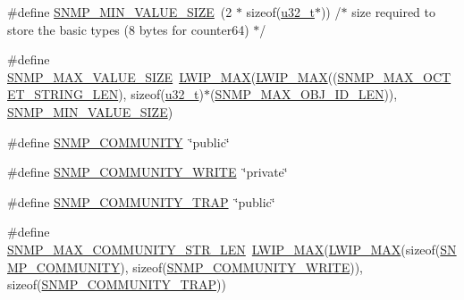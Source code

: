 \begin{DoxyCompactItemize}
\item 
\#define \hyperlink{group__snmp__opts_gac815d0dbe576299546ac612e7eaf3f90}{S\+N\+M\+P\+\_\+\+M\+I\+N\+\_\+\+V\+A\+L\+U\+E\+\_\+\+S\+I\+ZE}~(2 $\ast$ sizeof(\hyperlink{group__compiler__abstraction_ga4c14294869aceba3ef9d4c0c302d0f33}{u32\+\_\+t}$\ast$)) /$\ast$ size required to store the basic types (8 bytes for counter64) $\ast$/
\item 
\#define \hyperlink{group__snmp__opts_gafb4362575bc50476a7401a1ed14787f0}{S\+N\+M\+P\+\_\+\+M\+A\+X\+\_\+\+V\+A\+L\+U\+E\+\_\+\+S\+I\+ZE}~\hyperlink{openmote-cc2538_2lwip_2src_2include_2lwip_2def_8h_a21ea174d374106caeafb4aa3a24fbd2b}{L\+W\+I\+P\+\_\+\+M\+AX}(\hyperlink{openmote-cc2538_2lwip_2src_2include_2lwip_2def_8h_a21ea174d374106caeafb4aa3a24fbd2b}{L\+W\+I\+P\+\_\+\+M\+AX}((\hyperlink{group__snmp__opts_gae50cdd09697aa54a8b9f26432ac55ac2}{S\+N\+M\+P\+\_\+\+M\+A\+X\+\_\+\+O\+C\+T\+E\+T\+\_\+\+S\+T\+R\+I\+N\+G\+\_\+\+L\+EN}), sizeof(\hyperlink{group__compiler__abstraction_ga4c14294869aceba3ef9d4c0c302d0f33}{u32\+\_\+t})$\ast$(\hyperlink{group__snmp__opts_ga3ad9d293f90e3c885c4e3263a9064a41}{S\+N\+M\+P\+\_\+\+M\+A\+X\+\_\+\+O\+B\+J\+\_\+\+I\+D\+\_\+\+L\+EN})), \hyperlink{group__snmp__opts_gac815d0dbe576299546ac612e7eaf3f90}{S\+N\+M\+P\+\_\+\+M\+I\+N\+\_\+\+V\+A\+L\+U\+E\+\_\+\+S\+I\+ZE})
\item 
\#define \hyperlink{group__snmp__opts_ga316c1e1f06f0c7ca56589563809e64db}{S\+N\+M\+P\+\_\+\+C\+O\+M\+M\+U\+N\+I\+TY}~\char`\"{}public\char`\"{}
\item 
\#define \hyperlink{group__snmp__opts_gafb9414dc7a33978b62a3a9838b659464}{S\+N\+M\+P\+\_\+\+C\+O\+M\+M\+U\+N\+I\+T\+Y\+\_\+\+W\+R\+I\+TE}~\char`\"{}private\char`\"{}
\item 
\#define \hyperlink{group__snmp__opts_gaaefc9dda5f8e5c296018a463cdbac39b}{S\+N\+M\+P\+\_\+\+C\+O\+M\+M\+U\+N\+I\+T\+Y\+\_\+\+T\+R\+AP}~\char`\"{}public\char`\"{}
\item 
\#define \hyperlink{group__snmp__opts_ga0e98b58159a77688f87f9f50479177fd}{S\+N\+M\+P\+\_\+\+M\+A\+X\+\_\+\+C\+O\+M\+M\+U\+N\+I\+T\+Y\+\_\+\+S\+T\+R\+\_\+\+L\+EN}~\hyperlink{openmote-cc2538_2lwip_2src_2include_2lwip_2def_8h_a21ea174d374106caeafb4aa3a24fbd2b}{L\+W\+I\+P\+\_\+\+M\+AX}(\hyperlink{openmote-cc2538_2lwip_2src_2include_2lwip_2def_8h_a21ea174d374106caeafb4aa3a24fbd2b}{L\+W\+I\+P\+\_\+\+M\+AX}(sizeof(\hyperlink{group__snmp__opts_ga316c1e1f06f0c7ca56589563809e64db}{S\+N\+M\+P\+\_\+\+C\+O\+M\+M\+U\+N\+I\+TY}), sizeof(\hyperlink{group__snmp__opts_gafb9414dc7a33978b62a3a9838b659464}{S\+N\+M\+P\+\_\+\+C\+O\+M\+M\+U\+N\+I\+T\+Y\+\_\+\+W\+R\+I\+TE})), sizeof(\hyperlink{group__snmp__opts_gaaefc9dda5f8e5c296018a463cdbac39b}{S\+N\+M\+P\+\_\+\+C\+O\+M\+M\+U\+N\+I\+T\+Y\+\_\+\+T\+R\+AP}))

\end{DoxyCompactItemize}
